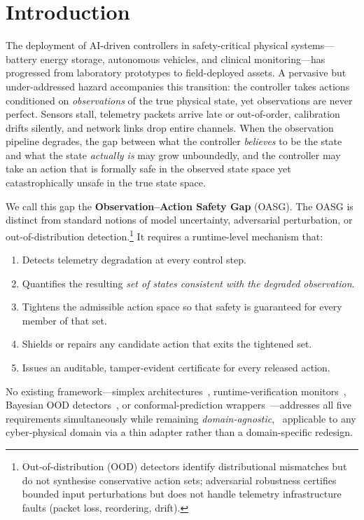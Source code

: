 \section{Introduction}\label{sec:intro}

The deployment of AI-driven controllers in safety-critical physical systems---battery
energy storage, autonomous vehicles, and clinical monitoring---has
progressed from laboratory prototypes to field-deployed assets.  A pervasive but
under-addressed hazard accompanies this transition: the controller takes actions
conditioned on \emph{observations} of the true physical state, yet observations are
never perfect.  Sensors stall, telemetry packets arrive late or out-of-order,
calibration drifts silently, and network links drop entire channels.  When the
observation pipeline degrades, the gap between what the controller \emph{believes} to
be the state and what the state \emph{actually is} may grow unboundedly, and the
controller may take an action that is formally safe in the observed state space yet
catastrophically unsafe in the true state space.

We call this gap the \textbf{Observation--Action Safety Gap} (OASG).  The OASG is
distinct from standard notions of model uncertainty, adversarial perturbation, or
out-of-distribution detection.\footnote{Out-of-distribution (OOD) detectors identify
distributional mismatches but do not synthesise conservative action sets; adversarial
robustness certifies bounded input perturbations but does not handle telemetry
infrastructure faults (packet loss, reordering, drift).}  It requires a runtime-level
mechanism that:
\begin{enumerate}[nosep]
  \item Detects telemetry degradation at every control step.
  \item Quantifies the resulting \emph{set of states consistent with the degraded
        observation}.
  \item Tightens the admissible action space so that safety is guaranteed for
        every member of that set.
  \item Shields or repairs any candidate action that exits the tightened set.
  \item Issues an auditable, tamper-evident certificate for every released action.
\end{enumerate}

No existing framework---simplex architectures~\cite{sha2001using},
runtime-verification monitors~\cite{leucker2009brief}, Bayesian OOD
detectors~\cite{hendrycks2017baseline}, or conformal-prediction wrappers~\cite{romano2019conformalized}---addresses
all five requirements simultaneously while remaining \emph{domain-agnostic},
\ie~applicable to any cyber-physical domain via a thin adapter rather than a domain-specific redesign.

